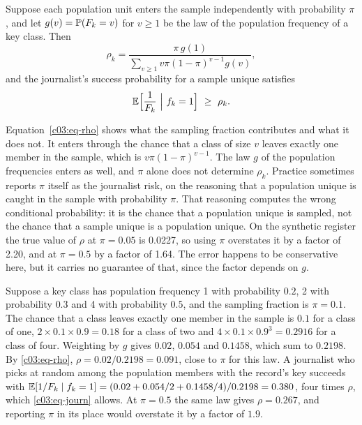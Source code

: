 \begin{proposition}\label{c03:prop-rho}
Suppose each population unit enters the sample independently with probability $\pi$,
and let $g(v) = \mathbb{P}(F_k = v)$ for $v \ge 1$ be the law of the population frequency of a
key class. Then
\begin{equation}\label{c03:eq-rho}
\rho_k = \frac{\pi\, g(1)}{\sum_{v \ge 1} v\pi(1-\pi)^{v-1} g(v)},
\end{equation}
and the journalist's success probability for a sample unique satisfies
\begin{equation}\label{c03:eq-journ}
\mathbb{E}\Big[\frac{1}{F_k}\ \Big|\ f_k = 1\Big] \ \ge\ \rho_k .
\end{equation}
\end{proposition}

Equation~\eqref{c03:eq-rho} shows what the sampling fraction contributes and what it
does not. It enters through the chance that a class of size $v$ leaves exactly one
member in the sample, which is $v\pi(1-\pi)^{v-1}$. The law $g$ of the population
frequencies enters as well, and $\pi$ alone does not determine $\rho_k$. Practice
sometimes reports $\pi$ itself as the journalist risk, on the reasoning that a
population unique is caught in the sample with probability $\pi$. That reasoning
computes the wrong conditional probability: it is the chance that a population unique
is sampled, not the chance that a sample unique is a population unique. On the
synthetic register the true value of $\rho$ at $\pi = 0.05$ is 0.0227, so using $\pi$
overstates it by a factor of 2.20, and at $\pi = 0.5$ by a factor of 1.64.
The error happens to be conservative here, but it carries no guarantee of that, since
the factor depends on $g$.

\begin{example}\label{c3:ex-rho}
Suppose a key class has population frequency 1 with probability $0.2$, 2 with probability $0.3$ and 4 with probability $0.5$, and the sampling fraction is $\pi=0.1$. The chance that a class leaves exactly one member in the sample is $0.1$ for a class of one, $2\times0.1\times0.9=0.18$ for a class of two and $4\times0.1\times0.9^3=0.2916$ for a class of four. Weighting by $g$ gives $0.02$, $0.054$ and $0.1458$, which sum to $0.2198$. By \eqref{c03:eq-rho}, $\rho=0.02/0.2198=0.091$, close to $\pi$ for this law. A journalist who picks at random among the population members with the record's key succeeds with $\mathbb{E}[1/F_k\mid f_k=1]=(0.02+0.054/2+0.1458/4)/0.2198=0.380$, four times $\rho$, which \eqref{c03:eq-journ} allows. At $\pi=0.5$ the same law gives $\rho=0.267$, and reporting $\pi$ in its place would overstate it by a factor of $1.9$.
\end{example}

